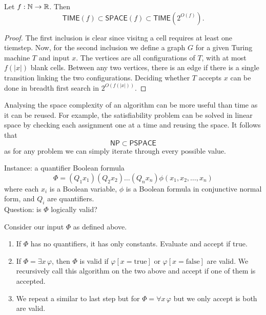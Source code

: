 \begin{theorem}[]
	Let $f: \mathbb{N} \to \mathbb{R}$. Then
	\[
		\mathsf{TIME}(f)
		\subset \mathsf{SPACE}(f)
		\subset \mathsf{TIME}(2^{O(f)}).
	\]
\end{theorem}

\begin{proof}
	The first inclusion is clear since visitng a cell requires at least
	one tiemstep.
	Now, for the second inclusion we define a graph $G$ for a given Turing 
	machine $T$ and input $x$.
	The vertices are all configurations of $T$, with at most
	$f(\left\lvert x \right\rvert)$ blank cells.
	Between any two vertices, there is an edge if there is a single
	transition linking the two configurations.
	Deciding whether $T$ accepts $x$ can be done in breadth first search
	in $2^{O(f(\left\lvert x \right\rvert))}$.
\end{proof}

Analysing the space complexity of an algorithm can be more useful than time as it can be reused.
For example, the satisfiability problem can be solved in linear space by
checking each assignment one at a time and reusing the space.
It follows that
\[
	\mathsf{NP} \subset \mathsf{PSPACE}
\]
as for any problem we can simply iterate through every possible value.

\begin{problem}[QSAT]
	Instance: a quantifier Boolean formula
	\[
		\Phi = (Q_1 x_1)(Q_2x_2) \ldots (Q_nx_n) \phi(x_1,x_2,\ldots,x_n)
	\]
	where each $x_i$ is a Boolean variable,
	$\phi$ is a Boolean formula in conjunctive normal form,
	and $Q_i$ are quantifiers. \\
	Question: is $\Phi$ logically valid?
\end{problem}

\begin{algorithm}
	Consider our input $\Phi$ as defined above.
	\begin{enumerate}
		\item If $\Phi$ has no quantifiers, it has only constants.
			Evaluate and accept if true.

		\item If $\Phi = \exists x\, \varphi$, then $\Phi$ is valid if
			$\varphi[x = \text{true}]$ or $\varphi[x = \text{false}]$
			are valid.
			We recursively call this algorithm on the two above and accept if
			one of them is accepted.

		\item We repeat a similar to last step but for 
			$\Phi = \forall x\,\varphi$ but we only accept is both are valid.
	\end{enumerate}
\end{algorithm}

